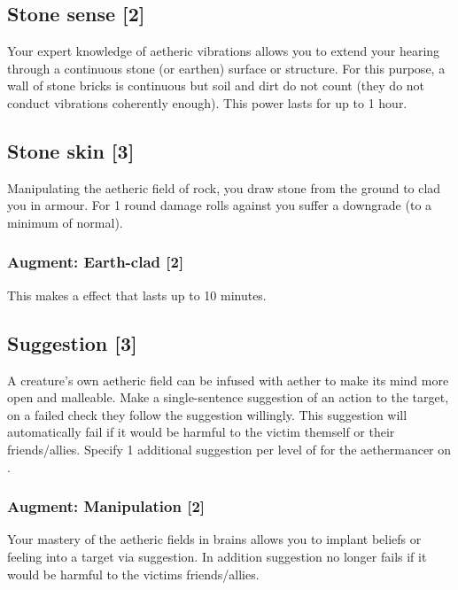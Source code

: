 \subsection{Stone sense [2]}
\label{spell:stone-sense}
Your expert knowledge of aetheric vibrations allows you to extend your hearing through a continuous stone (or earthen) surface or structure. For this purpose, a wall of stone bricks is continuous but soil and dirt do not count (they do not conduct vibrations coherently enough). This power lasts for up to 1 hour.


\subsection{Stone skin [3]}
Manipulating the aetheric field of rock, you draw stone from the ground to clad you in armour. For 1 round damage rolls against you suffer a  downgrade (to a minimum of normal). 
\subsubsection{Augment: Earth-clad [2]}
This makes  a  effect that lasts up to 10 minutes.


\subsection{Suggestion [3]}
A creature's own aetheric field can be infused with aether to make its mind more open and malleable. Make a single-sentence suggestion of an action to the target, on a failed  check they follow the suggestion willingly. This suggestion will automatically fail if it would
be harmful to the victim themself or their friends/allies. Specify 1 additional suggestion per level of  for the aethermancer on . 		
\subsubsection{Augment: Manipulation [2]}
Your mastery of the aetheric fields in brains allows you to implant beliefs or feeling into a target via suggestion. In addition suggestion no longer fails if it would be harmful to the victims friends/allies.




